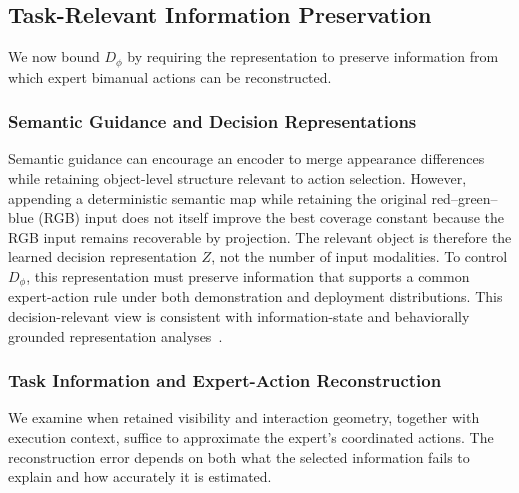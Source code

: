 \subsection{Task-Relevant Information Preservation}
\label{sec:representationanalysis}
We now bound $D_\phi$ by requiring the representation to preserve information from which expert bimanual actions can be reconstructed.

\subsubsection{Semantic Guidance and Decision Representations}
Semantic guidance can encourage an encoder to merge appearance differences while retaining object-level structure relevant to action selection.
However, appending a deterministic semantic map while retaining the original red--green--blue (RGB) input does not itself improve the best coverage constant because the RGB input remains recoverable by projection.
The relevant object is therefore the learned decision representation $Z$, not the number of input modalities.
To control $D_\phi$, this representation must preserve information that supports a common expert-action rule under both demonstration and deployment distributions.
This decision-relevant view is consistent with information-state and behaviorally grounded representation analyses~\cite{subramanian2022ais,zhang2021dbc}.

\subsubsection{Task Information and Expert-Action Reconstruction}
We examine when retained visibility and interaction geometry, together with execution context, suffice to approximate the expert's coordinated actions.
The reconstruction error depends on both what the selected information fails to explain and how accurately it is estimated.

